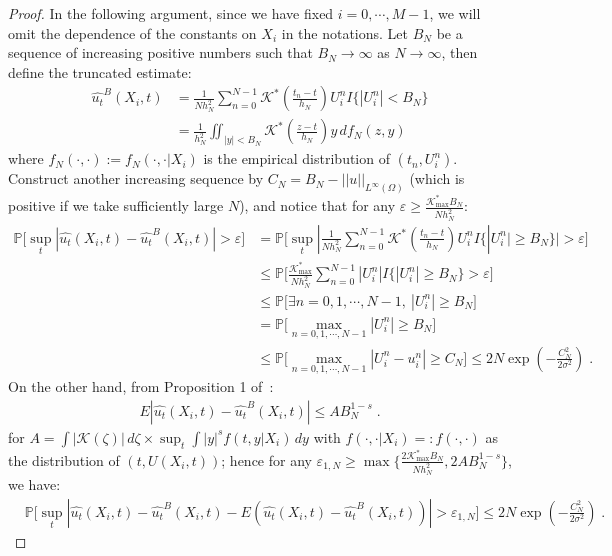 \documentclass[a4paper,11pt]{article}
\begin{document}
\begin{proof}
In the following argument, since we have fixed $i=0,\cdots, M-1$, we will omit the dependence of the constants on $X_i$ in the notations. Let $B_N$ be a sequence of increasing positive numbers such that $B_N\to \infty$ as $N\to\infty$, then define the truncated estimate:
\begin{align}
	\widehat{u_t}^B(X_i,t)&=\frac{1}{Nh^2_N}\sum_{n=0}^{N-1}\mathcal{K}^*(\frac{t_n-t}{h_N})U_i^n I\{|U_i^n|<B_N\}\\
	&=\frac{1}{h^2_N}\iint_{|y|<B_N}\mathcal{K}^*(\frac{z-t}{h_N})y\,df_N(z,y)
\end{align}
where $f_N(\cdot,\cdot):=f_N(\cdot,\cdot|X_i)$ is the empirical distribution of $(t_n,U_i^n)$. Construct another increasing sequence by $C_N = B_N-||u||_{L^\infty(\Omega)}$ (which is positive if we take sufficiently large $N$), and notice that for any $\varepsilon\geq \frac{\mathcal{K}^*_{\max}B_N}{Nh_N^2}$:
\begin{align*}
\mathbb{P}\Big[\sup_t|\widehat{u_t}(X_i,t)-\widehat{u_t}^B(X_i,t)|>\varepsilon\Big]&=\mathbb{P}\Big[\sup_t |\frac{1}{Nh^2_N}\sum_{n=0}^{N-1}\mathcal{K}^*(\frac{t_n-t}{h_N})U_i^n I\{|U_i^n|\geq B_N\}|>\varepsilon\Big]\\
&\leq \mathbb{P}\Big[\frac{\mathcal{K}^*_{\max}}{Nh_N^2}\sum_{n=0}^{N-1}|U_i^n|I\{|U_i^n|\geq B_N\}>\varepsilon\Big]\\
&\leq \mathbb{P}\Big[\exists n=0,1,\cdots, N-1,~|U_i^n|\geq B_N\Big]\\
& = \mathbb{P}\Big[\max_{n=0,1,\cdots,N-1}|U_i^n|\geq B_N\Big]\\
&\leq \mathbb{P}\Big[\max_{n=0,1,\cdots, N-1}|U_i^n-u_i^n|\geq C_N\Big]\leq 2N \exp(-\frac{C_N^2}{2\sigma^2})\;.
\end{align*}
On the other hand, from Proposition 1 of~\cite{mack1982weak}:
\begin{align*}
E|\widehat{u_t}(X_i,t)-\widehat{u_t}^B(X_i,t)|\leq AB_N^{1-s}\;.
\end{align*}
for $A=\int|\mathcal{K}(\zeta)|\,d\zeta\times\sup_{t}\int|y|^sf(t,y|X_i)\,dy$ with $f(\cdot,\cdot|X_i)=:f(\cdot,\cdot)$ as the distribution of $(t,U(X_i,t))$; hence for any $\varepsilon_{1,N}\geq \max\{\frac{2\mathcal{K}^*_{\max}B_N}{Nh_N^2},2AB_N^{1-s}\}$, we have:
\begin{align}
&\mathbb{P}\Big[\sup_t|\widehat{u_t}(X_i,t)-\widehat{u_t}^B(X_i,t)-E(\widehat{u_t}(X_i,t)-\widehat{u_t}^B(X_i,t))|>\varepsilon_{1,N}\Big]\leq 2N \exp(-\frac{C_N^2}{2\sigma^2})\;.\label{eq.sup}
\end{align}

\end{proof}
\end{document}
